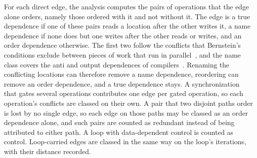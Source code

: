 For each direct edge, the analysis computes the pairs of operations that the edge alone orders, namely those ordered with it and not without it.
The edge is a true dependence if one of these pairs reads a location after the other writes it, a name dependence if none does but one writes after the other reads or writes, and an order dependence otherwise.
The first two follow the conflicts that Bernstein's conditions exclude between pieces of work that run in parallel~\citep{bernstein1966analysis}, and the name class covers the anti and output dependences of compilers~\citep{kuck1981dependence}.
Renaming the conflicting locations can therefore remove a name dependence, reordering can remove an order dependence, and a true dependence stays.
A synchronization that gates several operations contributes one edge per gated operation, so each operation's conflicts are classed on their own.
A pair that two disjoint paths order is lost by no single edge, so each edge on those paths may be classed as an order dependence alone, and such pairs are counted as redundant instead of being attributed to either path.
A loop with data-dependent control is counted as control.
Loop-carried edges are classed in the same way on the loop's iterations, with their distance recorded.

